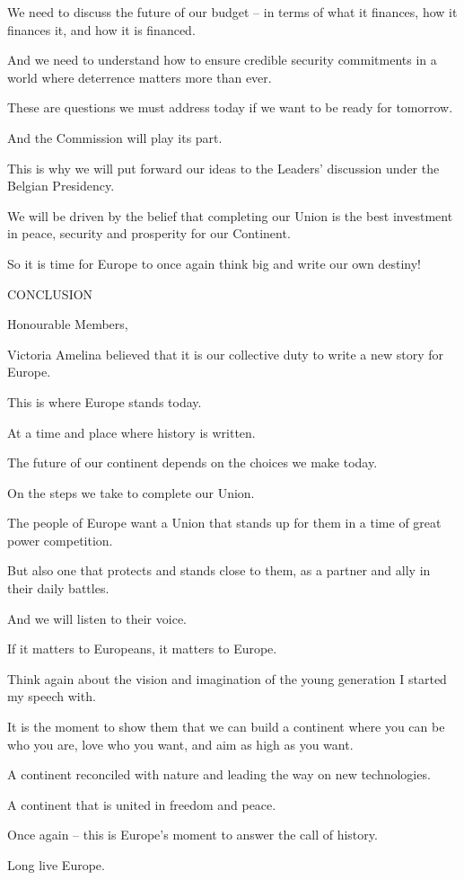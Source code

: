 \documentclass[a4paper,11pt]{article}
\begin{document}
We need to discuss the future of our budget – in terms of what it finances, how it finances it, and how it is financed.

And we need to understand how to ensure credible security commitments in a world where deterrence matters more than ever. 

These are questions we must address today if we want to be ready for tomorrow.

And the Commission will play its part.

This is why we will put forward our ideas to the Leaders' discussion under the Belgian Presidency. 

We will be driven by the belief that completing our Union is the best investment in peace, security and prosperity for our Continent.

So it is time for Europe to once again think big and write our own destiny!

 

CONCLUSION

Honourable Members,

Victoria Amelina believed that it is our collective duty to write a new story for Europe. 

This is where Europe stands today. 

At a time and place where history is written.

The future of our continent depends on the choices we make today. 

On the steps we take to complete our Union.

The people of Europe want a Union that stands up for them in a time of great power competition.

But also one that protects and stands close to them, as a partner and ally in their daily battles.

And we will listen to their voice.

If it matters to Europeans, it matters to Europe.

Think again about the vision and imagination of the young generation I started my speech with.

It is the moment to show them that we can build a continent where you can be who you are, love who you want, and aim as high as you want.

A continent reconciled with nature and leading the way on new technologies.

A continent that is united in freedom and peace. 

Once again – this is Europe's moment to answer the call of history. 

Long live Europe.  
 \newpage
\end{document}

